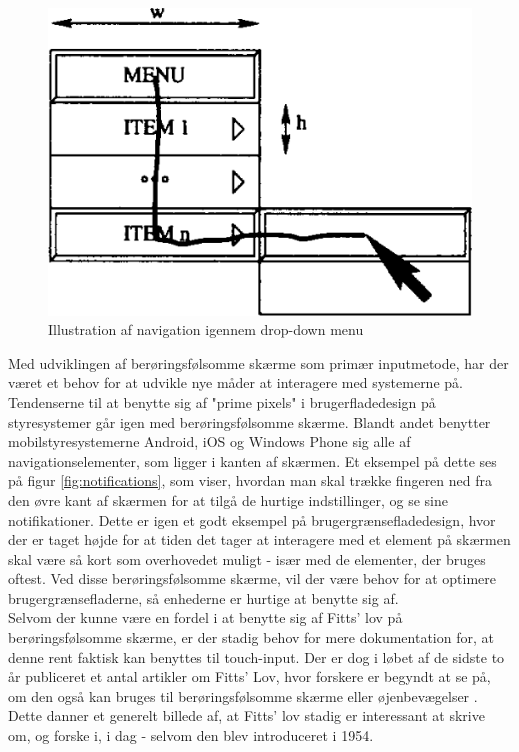 \begin{figure}
	\centering
	\includegraphics[width=\linewidth]{images/illustrations/dropdown}
	\caption{Illustration af navigation igennem drop-down menu}
	\label{fig:dropdown}
\end{figure}

Med udviklingen af berøringsfølsomme skærme som primær inputmetode, har der været et behov for at udvikle nye måder at interagere med systemerne på. Tendenserne til at benytte sig af "prime pixels" i brugerfladedesign på styresystemer går igen med berøringsfølsomme skærme. Blandt andet benytter mobilstyresystemerne Android, iOS og Windows Phone sig alle af navigationselementer, som  ligger i kanten af skærmen. Et eksempel på dette ses på figur \ref{fig:notifications}, som viser, hvordan man skal trække fingeren ned fra den øvre kant af skærmen for at tilgå de hurtige indstillinger, og se sine notifikationer. Dette er igen et godt eksempel på brugergrænsefladedesign, hvor der er taget højde for at tiden det tager at interagere med et element på skærmen skal være så kort som overhovedet muligt - især med de elementer, der bruges oftest. Ved disse berøringsfølsomme skærme, vil der være behov for at optimere brugergrænsefladerne, så enhederne er hurtige at benytte sig af.\\

Selvom der kunne være en fordel i at benytte sig af Fitts' lov på berøringsfølsomme skærme, er der stadig behov for mere dokumentation for, at denne rent faktisk kan benyttes til touch-input. Der er dog i løbet af de sidste to år publiceret et antal artikler om Fitts' Lov, hvor forskere er begyndt at se på, om den også kan bruges til berøringsfølsomme skærme eller øjenbevægelser \cite{hong2015} \cite{zhao2015} \cite{jiang2014} \cite{greene2014}. Dette danner et generelt billede af, at Fitts' lov stadig er interessant at skrive om, og forske i, i dag - selvom den blev introduceret i 1954.\\

